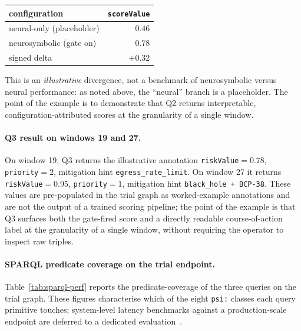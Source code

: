 \documentclass[futureinternet,article,submit,pdftex,moreauthors]{Definitions/mdpi}
\begin{document}
\begin{center}
\begin{tabular}{@{}lr@{}}
\toprule
configuration  & \texttt{scoreValue} \\
\midrule
neural-only (placeholder) & $0.46$ \\
neurosymbolic (gate on)   & $0.78$ \\
\midrule
signed delta              & $+0.32$ \\
\bottomrule
\end{tabular}
\end{center}

This is an \emph{illustrative} divergence, not a benchmark of
neurosymbolic versus neural performance: as noted above, the
``neural'' branch is a placeholder. The point of the example is to
demonstrate that Q2 returns interpretable, configuration-attributed
scores at the granularity of a single window.

\paragraph{Q3 result on windows 19 and 27.} On window 19, Q3 returns
the illustrative annotation \texttt{riskValue}$=0.78$, \texttt{priority}$=2$,
mitigation hint \texttt{egress\_rate\_limit}. On window 27 it returns
\texttt{riskValue}$=0.95$, \texttt{priority}$=1$, mitigation hint
\texttt{black\_hole + BCP-38}. These values are pre-populated in the
trial graph as worked-example annotations and are not the output of a
trained scoring pipeline; the point of the example is that Q3 surfaces
both the gate-fired score and a directly readable course-of-action
label at the granularity of a single window, without requiring the
operator to inspect raw triples.

\paragraph{SPARQL predicate coverage on the trial endpoint.}
Table~\ref{tab:sparql-perf} reports the predicate-coverage
of the three queries on the trial graph. These figures characterise
which of the eight \texttt{psi:} classes each query primitive touches;
system-level latency benchmarks against a production-scale endpoint
are deferred to a dedicated evaluation~\cite{paper5}.
\end{document}

